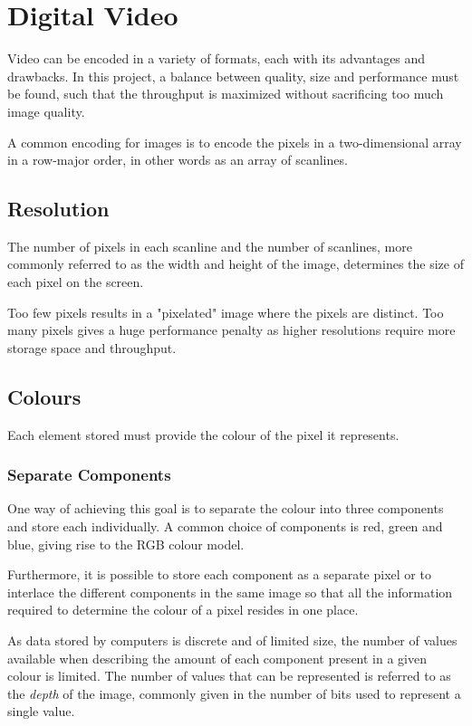 \section{Digital Video} \label{sec:DigitalVideo}
Video can be encoded in a variety of formats, each with its advantages and drawbacks.
In this project, a balance between quality, size and performance must be found, such that the throughput is maximized without sacrificing too much image quality.

A common encoding for images is to encode the pixels in a two-dimensional array in a row-major order, in other words as an array of scanlines.

\subsection{Resolution}
The number of pixels in each scanline and the number of scanlines, more commonly referred to as the width and height of the image, determines the size of each pixel on the screen.

Too few pixels results in a "pixelated" image where the pixels are distinct.
Too many pixels gives a huge performance penalty as higher resolutions require more storage space and throughput.

\subsection{Colours}
Each element stored must provide the colour of the pixel it represents.

\subsubsection{Separate Components}
One way of achieving this goal is to separate the colour into three components and store each individually.
A common choice of components is red, green and blue, giving rise to the RGB colour model.

Furthermore, it is possible to store each component as a separate pixel or to interlace the different components in the same image so that all the information required to determine the colour of a pixel resides in one place.

As data stored by computers is discrete and of limited size, the number of values available when describing the amount of each component present in a given colour is limited.
The number of values that can be represented is referred to as the \textit{depth} of the image, commonly given in the number of bits used to represent a single value.

